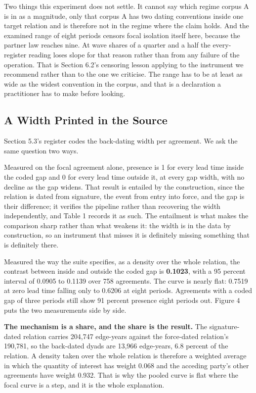 \documentclass[twoside,11pt]{article}
\begin{document}
Two things this experiment does not settle. It cannot say which regime corpus A is in as a magnitude, only that corpus A has two dating conventions inside one target relation and is therefore not in the regime where the claim holds. And the examined range of eight periods censors focal isolation itself here, because the partner law reaches nine. At wave shares of a quarter and a half the every-register reading loses slope for that reason rather than from any failure of the operation. That is Section 6.2's censoring lesson applying to the instrument we recommend rather than to the one we criticise. The range has to be at least as wide as the widest convention in the corpus, and that is a declaration a practitioner has to make before looking.

\subsection{A Width Printed in the Source}

Section 5.3's register codes the back-dating width per agreement. We ask the same question two ways.

Measured on the focal agreement alone, presence is 1 for every lead time inside the coded gap and 0 for every lead time outside it, at every gap width, with no decline as the gap widens. That result is entailed by the construction, since the relation is dated from signature, the event from entry into force, and the gap is their difference; it verifies the pipeline rather than recovering the width independently, and Table 1 records it as such. The entailment is what makes the comparison sharp rather than what weakens it: the width is in the data by construction, so an instrument that misses it is definitely missing something that is definitely there.

Measured the way the suite specifies, as a density over the whole relation, the contrast between inside and outside the coded gap is \textbf{0.1023}, with a 95 percent interval of 0.0905 to 0.1139 over 758 agreements. The curve is nearly flat: 0.7519 at zero lead time falling only to 0.6206 at eight periods. Agreements with a coded gap of three periods still show 91 percent presence eight periods out. Figure 4 puts the two measurements side by side.

\textbf{The mechanism is a share, and the share is the result.} The signature-dated relation carries 204,747 edge-years against the force-dated relation's 190,781, so the back-dated dyads are 13,966 edge-years, 6.8 percent of the relation. A density taken over the whole relation is therefore a weighted average in which the quantity of interest has weight 0.068 and the acceding party's other agreements have weight 0.932. That is why the pooled curve is flat where the focal curve is a step, and it is the whole explanation.
\end{document}
